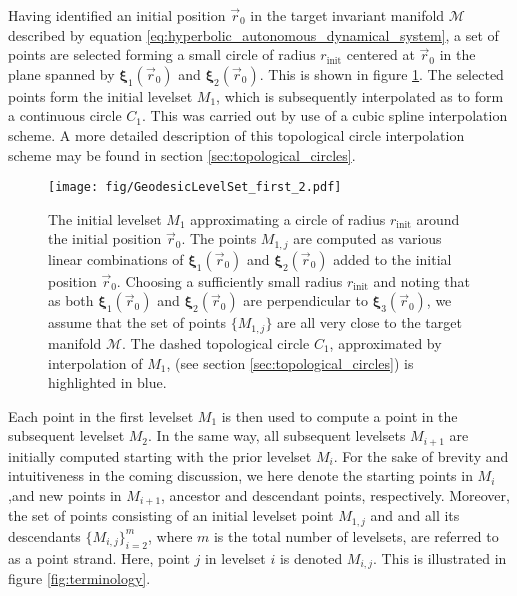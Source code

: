 Having identified an initial position $\vec{r}_0$ in the target invariant manifold $\mathcal{M}$ described by equation \eqref{eq:hyperbolic_autonomous_dynamical_system}, a set of points are selected forming a small circle of radius $r_{\text{init}}$ centered at $\vec{r}_0$ in the plane spanned by $\bm{\xi}_1(\vec{r}_0)$ and $\bm{\xi}_2(\vec{r}_0)$. This is shown in figure \ref{fig:GeodesicLevelSet_first}. The selected points form the initial levelset $M_1$, which is subsequently interpolated as to form a continuous circle $C_1$. This was carried out by use of a cubic spline interpolation scheme. A more detailed description of this topological circle interpolation scheme may be found in section \ref{sec:topological_circles}.

\begin{figure}[h!] 
\centering
\texttt{[image: fig/GeodesicLevelSet\_first\_2.pdf]}
\caption{The initial levelset $M_1$ approximating a circle of radius $r_{\text{init}}$ around the initial position $\vec{r}_0$. The points $M_{1,j}$ are computed as various linear combinations of $\bm{\xi}_1(\vec{r}_0)$ and $\bm{\xi}_2(\vec{r}_0)$ added to the initial position $\vec{r}_0$. Choosing a sufficiently small radius $r_{\text{init}}$ and noting that as both $\bm{\xi}_1(\vec{r}_0)$ and $\bm{\xi}_2(\vec{r}_0)$ are perpendicular to $\bm{\xi}_3(\vec{r}_0)$, we assume that the set of points $\{M_{1,j}\}$ are all very close to the target manifold $\mathcal{M}$. The dashed topological circle $C_1$, approximated by interpolation of $M_1$, (see section \ref{sec:topological_circles}) is highlighted in blue.}\label{fig:GeodesicLevelSet_first}
\end{figure}

Each point in the first levelset $M_1$ is then used to compute a point in the subsequent levelset $M_{2}$. In the same way, all subsequent levelsets $M_{i+1}$ are initially computed starting with the prior levelset $M_i$. For the sake of brevity and intuitiveness in the coming discussion, we here denote the starting points in $M_i$ ,and new points in $M_{i+1}$, ancestor and descendant points, respectively. Moreover, the set of points consisting of an initial levelset point $M_{1,j}$ and and all its descendants $\{M_{i,j}\}_{i=2}^{m}$, where $m$ is the total number of levelsets, are referred to as a point strand. Here, point $j$ in levelset $i$ is denoted $M_{i,j}$. This is illustrated in figure \ref{fig:terminology}. %

